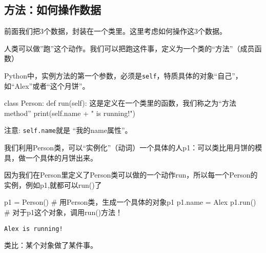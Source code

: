 \documentclass[
  letterpaper,
  DIV=11,
  numbers=noendperiod]{scrreprt}
\newenvironment{Shaded}{\begin{snugshade}}{\end{snugshade}}
\newcommand{\BuiltInTok}[1]{\textcolor[rgb]{0.00,0.23,0.31}{#1}}
\newcommand{\CommentTok}[1]{\textcolor[rgb]{0.37,0.37,0.37}{#1}}
\newcommand{\KeywordTok}[1]{\textcolor[rgb]{0.00,0.23,0.31}{#1}}
\newcommand{\NormalTok}[1]{\textcolor[rgb]{0.00,0.23,0.31}{#1}}
\newcommand{\OperatorTok}[1]{\textcolor[rgb]{0.37,0.37,0.37}{#1}}
\newcommand{\StringTok}[1]{\textcolor[rgb]{0.13,0.47,0.30}{#1}}
\newcommand{\VariableTok}[1]{\textcolor[rgb]{0.07,0.07,0.07}{#1}}
\begin{document}
\hypertarget{ux65b9ux6cd5ux5982ux4f55ux64cdux4f5cux6570ux636e}{%
\subsection{方法：如何操作数据}\label{ux65b9ux6cd5ux5982ux4f55ux64cdux4f5cux6570ux636e}}

前面我们把3个数据，封装在一个类里。这里考虑如何操作这3个数据。

人类可以做''跑''这个动作。我们可以把跑这件事，定义为一个类的``方法''（成员函数）

Python中，实例方法的第一个参数，必须是\texttt{self}，特质具体的对象``自己''，如``Alex''或者``这个月饼''。

\begin{Shaded}
\begin{Highlighting}[]
\KeywordTok{class}\NormalTok{ Person:}
    \KeywordTok{def}\NormalTok{ run(}\VariableTok{self}\NormalTok{):}
        \CommentTok{\textquotesingle{}\textquotesingle{}\textquotesingle{}}
\CommentTok{        这是定义在一个类里的函数，我们称之为“方法method”}
\CommentTok{        \textquotesingle{}\textquotesingle{}\textquotesingle{}}
        \BuiltInTok{print}\NormalTok{(}\VariableTok{self}\NormalTok{.name }\OperatorTok{+} \StringTok{" is running!"}\NormalTok{)}
\end{Highlighting}
\end{Shaded}

注意: \texttt{self.name}就是 ``我的name属性''。

我们利用Person类，可以``实例化''（动词）一个具体的人p1：可以类比用月饼的模具，做一个具体的月饼出来。

因为我们在Person里定义了Person类可以做的一个动作run，所以每一个Person的实例，例如p1,就都可以run()了

\begin{Shaded}
\begin{Highlighting}[]
\NormalTok{p1 }\OperatorTok{=}\NormalTok{ Person() }\CommentTok{\# 用Person类，生成一个具体的对象p1}
\NormalTok{p1.name }\OperatorTok{=} \StringTok{\textquotesingle{}Alex\textquotesingle{}}
\NormalTok{p1.run() }\CommentTok{\# 对于p1这个对象，调用run()方法！}
\end{Highlighting}
\end{Shaded}

\begin{verbatim}
Alex is running!
\end{verbatim}

类比：某个对象做了某件事。
\end{document}
